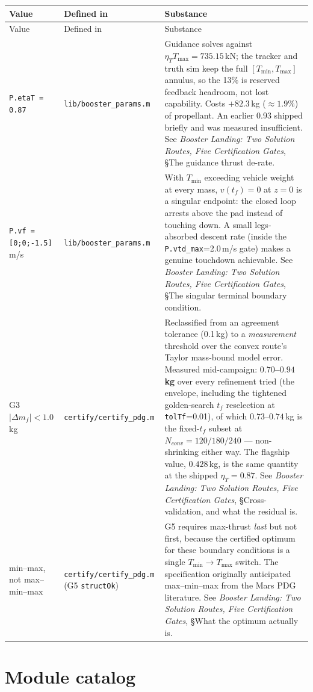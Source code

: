 \documentclass[11pt]{article}
\newcommand{\thenote}{\emph{Booster Landing: Two Solution Routes, Five
Certification Gates}}
\newcommand{\noteS}[1]{\thenote, \S#1}
\newcommand{\Tmin}{T_{\min}}
\newcommand{\Tmax}{T_{\max}}
\newcommand{\etaT}{\eta_T}
\newcommand{\file}[1]{\texttt{#1}}
\begin{document}
\begin{center}
\begin{longtable}{@{}lL{4.2cm}L{6.3cm}@{}}
\toprule
Value & Defined in & Substance \\
\midrule
\endfirsthead
\toprule
Value & Defined in & Substance \\
\midrule
\endhead
\texttt{P.etaT = 0.87} & \file{lib/booster\_params.m} &
Guidance solves against $\etaT\Tmax = 735.15$\,kN; the tracker and truth sim
keep the full $[\Tmin,\Tmax]$ annulus, so the 13\% is reserved feedback
headroom, not lost capability. Costs $+82.3$\,kg ($\approx1.9\%$) of
propellant. An earlier 0.93 shipped briefly and was measured insufficient.
See \noteS{The guidance thrust de-rate}. \\
\texttt{P.vf = [0;0;-1.5]} m/s & \file{lib/booster\_params.m} &
With $\Tmin$ exceeding vehicle weight at every mass, $v(t_f)=0$ at $z=0$ is
a singular endpoint: the closed loop arrests above the pad instead of
touching down. A small legs-absorbed descent rate (inside the
\texttt{P.vtd\_max}=2.0\,m/s gate) makes a genuine touchdown achievable.
See \noteS{The singular terminal boundary condition}. \\
G3 $|\Delta m_f| < 1.0$\,kg & \file{certify/certify\_pdg.m} &
Reclassified from an agreement tolerance (0.1\,kg) to a \emph{measurement}
threshold over the convex route's Taylor mass-bound model error. Measured
mid-campaign: \textbf{$0.70$--$0.94$\,kg} over every refinement tried
(the envelope, including the tightened golden-search $t_f$ reselection at
\texttt{tolTf}=0.01), of which $0.73$--$0.74$\,kg is the fixed-$t_f$
subset at $N_{conv} = 120/180/240$ --- non-shrinking either way. The
flagship value, $0.428$\,kg, is the same quantity at the shipped
$\etaT = 0.87$. See
\noteS{Cross-validation, and what the residual is}. \\
min--max, not max--min--max & \file{certify/certify\_pdg.m} (G5
\texttt{structOk}) &
G5 requires max-thrust \emph{last} but not first, because the certified
optimum for these boundary conditions is a single $\Tmin\!\to\!\Tmax$
switch. The specification originally anticipated max--min--max from the Mars
PDG literature. See \noteS{What the optimum actually is}. \\
\bottomrule
\end{longtable}
\end{center}

\section{Module catalog}
\label{sec:modules}
\end{document}
